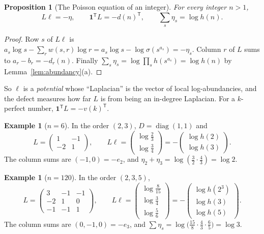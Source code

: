 \documentclass[11pt]{article}
\newtheorem{proposition}[theorem]{Proposition}
\theoremstyle{definition}
\newtheorem{example}[theorem]{Example}
\theoremstyle{remark}
\newcommand{\one}{\mathbf{1}}
\begin{document}
\begin{proposition}[The Poisson equation of an integer]\label{prop:poisson}
For every integer $n>1$,
\[
L\ell=-\eta,\qquad \one^{\mathsf T}L=-d(n)^{\mathsf T},\qquad
\sum_s\eta_s=\log h(n).
\]
\end{proposition}

\begin{proof}
Row $s$ of $L\ell$ is
$a_s\log s-\sum_r w(s,r)\log r=a_s\log s-\log\sigma(s^{a_s})=-\eta_s$.
Column $r$ of $L$ sums to $a_r-b_r=-d_r(n)$.  Finally
$\sum_s\eta_s=\log\prod_s h(s^{a_s})=\log h(n)$ by
Lemma~\ref{lem:abundancy}(a).
\end{proof}

So $\ell$ is a \emph{potential} whose ``Laplacian'' is the vector of local
log-abundancies, and the defect measures how far $L$ is from being an
in-degree Laplacian.  For a $k$-perfect number, $\one^{\mathsf T}L=-v(k)^{\mathsf T}$.

\begin{example}[$n=6$]
In the order $(2,3)$, $D=\operatorname{diag}(1,1)$ and
\[
L=\begin{pmatrix}1&-1\\-2&1\end{pmatrix},\qquad
L\ell=\begin{pmatrix}\log\frac23\\[2pt]\log\frac34\end{pmatrix}
=-\begin{pmatrix}\log h(2)\\ \log h(3)\end{pmatrix}.
\]
The column sums are $(-1,0)=-e_2$, and $\eta_2+\eta_3=\log(\tfrac32\cdot\tfrac43)=\log2$.
\end{example}

\begin{example}[$n=120$]\label{ex:120poisson}
In the order $(2,3,5)$,
\[
L=\begin{pmatrix}3&-1&-1\\-2&1&0\\-1&-1&1\end{pmatrix},\qquad
L\ell=\begin{pmatrix}\log\frac{8}{15}\\[2pt]\log\frac34\\[2pt]\log\frac56\end{pmatrix}
=-\begin{pmatrix}\log h(2^3)\\ \log h(3)\\ \log h(5)\end{pmatrix}.
\]
The column sums are $(0,-1,0)=-e_3$, and
$\sum\eta_s=\log\bigl(\tfrac{15}{8}\cdot\tfrac43\cdot\tfrac65\bigr)=\log3$.
\end{example}
\end{document}
